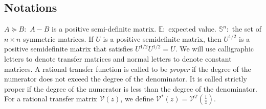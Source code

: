 \subsection*{Notations}
$A\succeq B:$ $A-B$ is a positive semi-definite matrix. $\mathbb{E}:$ expected value. $\mathbb S^n:$ the set of $n\times n$ symmetric matrices. If $U$ is a positive semidefinite matrix, then $U^{1/2}$ is a positive semidefinite matrix that satisfies $U^{1/2}U^{1/2} = U$. We will use calligraphic letters to denote transfer matrices and normal letters to denote constant matrices. A rational transfer function is called to be \emph{proper} if the degree of the numerator does not exceed the degree of the denominator. It is called strictly proper if the degree of the numerator is less than the degree of the denominator. For a rational transfer matrix $\mathcal V(z)$, we define $\mathcal V^*(z)=\mathcal V^T(\frac{1}{z})$.